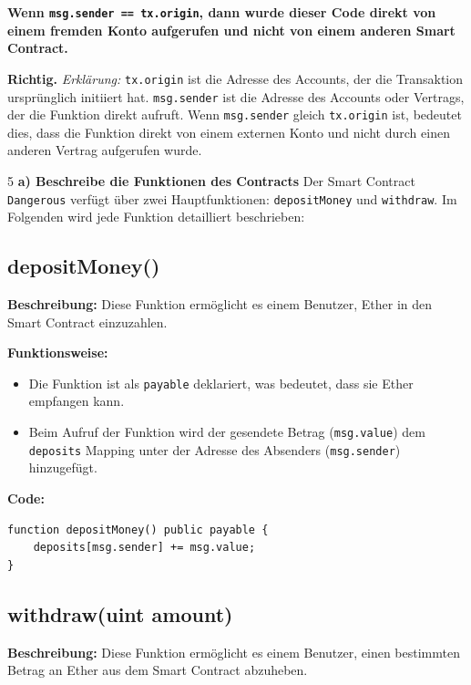 \documentclass[german]{../uebung}
\begin{document}
\begin{exercise}{4}
    \item \textbf{Wenn \texttt{msg.sender == tx.origin}, dann wurde dieser Code direkt von einem fremden Konto aufgerufen und nicht von einem anderen Smart Contract.}

    \textbf{Richtig.}
    \newline
    \textit{Erklärung:} \texttt{tx.origin} ist die Adresse des Accounts, der die Transaktion ursprünglich initiiert hat. \texttt{msg.sender} ist die Adresse des Accounts oder Vertrags, der die Funktion direkt aufruft. Wenn \texttt{msg.sender} gleich \texttt{tx.origin} ist, bedeutet dies, dass die Funktion direkt von einem externen Konto und nicht durch einen anderen Vertrag aufgerufen wurde.
\end{exercise}

\begin{exercise} {5}
    \textbf{a) Beschreibe die Funktionen des Contracts}
    Der Smart Contract \texttt{Dangerous} verfügt über zwei Hauptfunktionen: \texttt{depositMoney} und \texttt{withdraw}. Im Folgenden wird jede Funktion detailliert beschrieben:

    \subsection*{depositMoney()}

    \textbf{Beschreibung:} Diese Funktion ermöglicht es einem Benutzer, Ether in den Smart Contract einzuzahlen.

    \textbf{Funktionsweise:}
    \begin{itemize}
        \item Die Funktion ist als \texttt{payable} deklariert, was bedeutet, dass sie Ether empfangen kann.
        \item Beim Aufruf der Funktion wird der gesendete Betrag (\texttt{msg.value}) dem \texttt{deposits} Mapping unter der Adresse des Absenders (\texttt{msg.sender}) hinzugefügt.
    \end{itemize}

    \textbf{Code:}
    \begin{verbatim}
function depositMoney() public payable {
    deposits[msg.sender] += msg.value;
}
\end{verbatim}

    \subsection*{withdraw(uint amount)}

    \textbf{Beschreibung:} Diese Funktion ermöglicht es einem Benutzer, einen bestimmten Betrag an Ether aus dem Smart Contract abzuheben.


\end{exercise}
\end{document}
